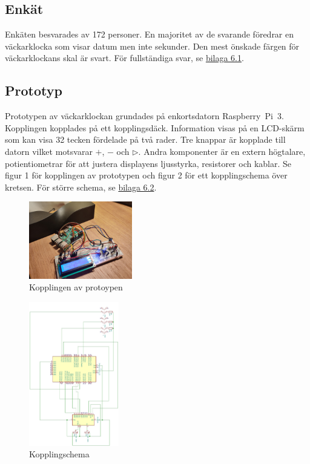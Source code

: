 \subsection{Enkät}
Enkäten besvarades av 172 personer. En majoritet av de svarande föredrar en väckarklocka som visar datum men inte sekunder. Den mest önskade färgen för väckarklockans skal är svart. För fullständiga svar, se \hyperref[sec:svar]{bilaga 6.1}.


\subsection{Prototyp}
    Prototypen av väckarklockan grundades på enkortsdatorn Raspberry~Pi~3. Kopplingen kopplades på ett kopplingsdäck. Information visas på en LCD-skärm som kan visa 32 tecken fördelade på två rader. Tre knappar är kopplade till datorn vilket motsvarar $+$, $-$ och $\triangleright$. Andra komponenter är en extern högtalare, potientiometrar för att justera displayens ljusstyrka, resistorer och kablar. Se figur 1 för kopplingen av prototypen och figur 2 för ett kopplingschema över kretsen. För större schema, se \hyperref[sec:krets]{bilaga 6.2}.
    \begin{figure}[h!]
    \centering

        \includegraphics[width=0.4\textwidth]{bilder/koppling.jpg} %
        \caption{Kopplingen av protoypen}
    \end{figure}
    \begin{figure}[h!]
    \centering
        \includegraphics[width=0.35\textwidth,angle=90]{bilder/krets2.png} %
        \caption{Kopplingschema}
    \end{figure}

